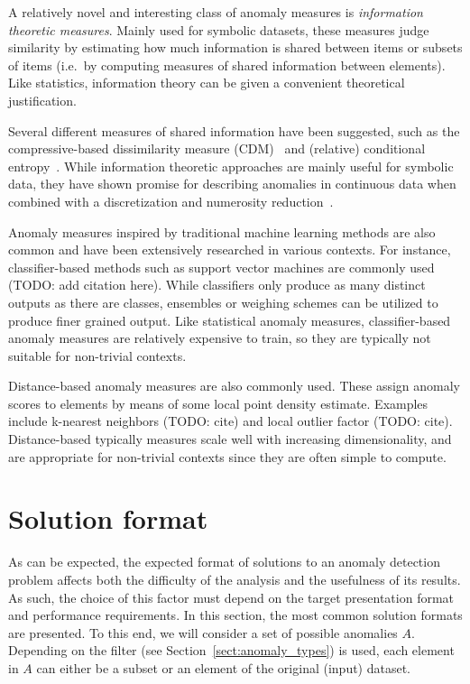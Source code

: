 A relatively novel and interesting class of anomaly measures is \emph{information theoretic measures}. Mainly used for symbolic datasets, these measures judge similarity by estimating how much information is shared between items or subsets of items (i.e.\ by computing measures of shared information between elements). Like statistics, information theory can be given a convenient theoretical justification.

Several different measures of shared information have been suggested, such as the compressive-based dissimilarity measure (CDM)~\cite{keogh2} and (relative) conditional entropy~\cite{xiang}. While information theoretic approaches are mainly useful for symbolic data, they have shown promise for describing anomalies in continuous data when combined with a discretization and numerosity reduction~\cite{keogh2}.

Anomaly measures inspired by traditional machine learning methods are also common and have been extensively researched in various contexts. For instance, classifier-based methods such as support vector machines are commonly used (TODO: add citation here). While classifiers only produce as many distinct outputs as there are classes, ensembles or weighing schemes can be utilized to produce finer grained output. Like statistical anomaly measures, classifier-based anomaly measures are relatively expensive to train, so they are typically not suitable for non-trivial contexts.

Distance-based anomaly measures are also commonly used. These assign anomaly scores to elements by means of some local point density estimate. Examples include k-nearest neighbors (TODO: cite) and local outlier factor (TODO: cite). Distance-based typically measures scale well with increasing dimensionality, and are appropriate for non-trivial contexts since they are often simple to compute.

\section{Solution format}
\label{sect:output_format}

As can be expected, the expected format of solutions to an anomaly detection problem affects both the difficulty of the analysis and the usefulness of its results. As such, the choice of this factor must depend on the target presentation format and performance requirements. In this section, the most common solution formats are presented. To this end, we will consider a set of possible anomalies $A$. Depending on the filter (see Section~\ref{sect:anomaly_types}) is used, each element in $A$ can either be a subset or an element of the original (input) dataset.


